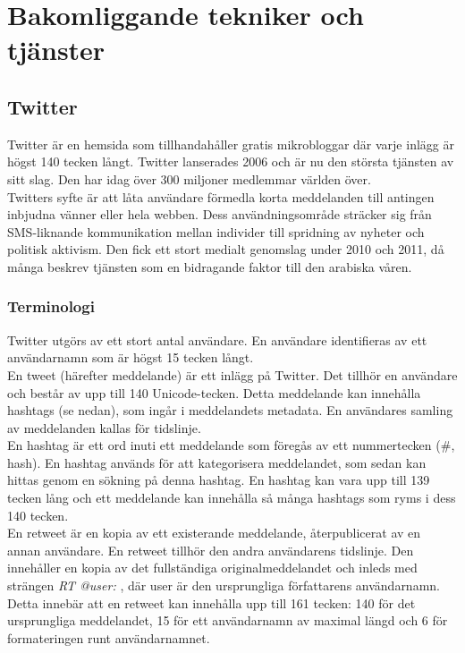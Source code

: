 \documentclass[a4paper,11pt]{article}
\begin{document}
\section{Bakomliggande tekniker och tjänster}

\subsection{Twitter}
Twitter är en hemsida som tillhandahåller gratis mikrobloggar där varje inlägg är högst 140 tecken långt. Twitter lanserades 2006 och är nu den största tjänsten av sitt slag. Den har idag över 300 miljoner medlemmar världen över. \\

Twitters syfte är att låta användare förmedla korta meddelanden till antingen inbjudna vänner eller hela webben. Dess användningsområde sträcker sig från SMS-liknande kommunikation mellan individer till spridning av nyheter och politisk aktivism. Den fick ett stort medialt genomslag under 2010 och 2011, då många beskrev tjänsten som en bidragande faktor till den arabiska våren.

\subsubsection{Terminologi}
Twitter utgörs av ett stort antal användare. En användare identifieras av ett användarnamn som är högst 15 tecken långt. \\

En tweet (härefter meddelande) är ett inlägg på Twitter. Det tillhör en användare och består av upp till 140 Unicode-tecken. Detta meddelande kan innehålla hashtags (se nedan), som ingår i meddelandets metadata. En användares samling av meddelanden kallas för tidslinje. \\

En hashtag är ett ord inuti ett meddelande som föregås av ett nummertecken ({\#}, hash). En hashtag används för att kategorisera meddelandet, som sedan kan hittas genom en sökning på denna hashtag. En hashtag kan vara upp till 139 tecken lång och ett meddelande kan innehålla så många hashtags som ryms i dess 140 tecken. \\

En retweet är en kopia av ett existerande meddelande, återpublicerat av en annan användare. En retweet tillhör den andra användarens tidslinje. Den innehåller en kopia av det fullständiga originalmeddelandet och inleds med strängen {\it RT @user: }, där user är den ursprungliga författarens användarnamn. Detta innebär att en retweet kan innehålla upp till 161 tecken: 140 för det ursprungliga meddelandet, 15 för ett användarnamn av maximal längd och 6 för formateringen runt användarnamnet.
\end{document}
